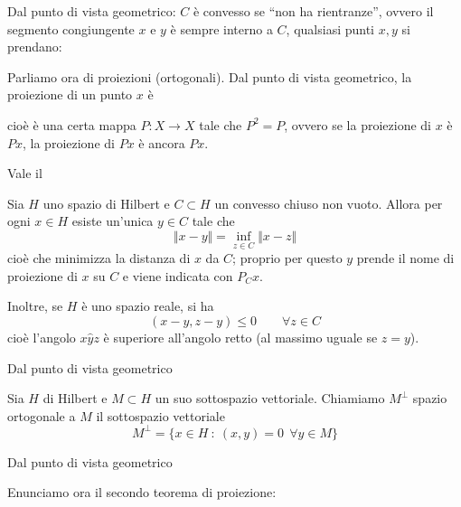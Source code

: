 Dal punto di vista geometrico: $C$ è convesso se ``non ha rientranze'', ovvero il segmento congiungente $x$ e $y$ è sempre interno a $C$, qualsiasi punti $x,y$ si prendano:


Parliamo ora di proiezioni (ortogonali). Dal punto di vista geometrico, la proiezione di un punto $x$ è


cioè è una certa mappa $P:X\to X$ tale che $P^2=P$, ovvero se la proiezione di $x$ è $Px$, la proiezione di $Px$ è ancora $Px$.

Vale il

\begin{thm}
Sia $H$ uno spazio di Hilbert e $C\subset H$ un convesso chiuso non vuoto. Allora per ogni $x\in H$ esiste un'unica $y\in C$ tale che
\begin{equation*}
\Vert x - y \Vert =\inf_{z\in C} \Vert x-z \Vert
\end{equation*}
cioè che minimizza la distanza di $x$ da $C$; proprio per questo $y$ prende il nome di proiezione di $x$ su $C$ e viene indicata con $P_Cx$. 

Inoltre, se $H$ è uno spazio reale, si ha
\begin{equation*}
(x-y,z-y)\leq 0\qquad \forall z \in C
\end{equation*}
cioè l'angolo $x\widehat{y}z$ è superiore all'angolo retto (al massimo uguale se $z=y$).
\end{thm}

Dal punto di vista geometrico


\begin{defn}
Sia $H$ di Hilbert e $M\subset H$ un suo sottospazio vettoriale. Chiamiamo $M^{\perp}$ spazio ortogonale a $M$ il sottospazio vettoriale
\begin{equation*}
M^{\perp} = \{x\in H\ :\ (x, y) = 0\ \ \forall y\in M\}
\end{equation*}
\end{defn}

Dal punto di vista geometrico


Enunciamo ora il secondo teorema di proiezione:

